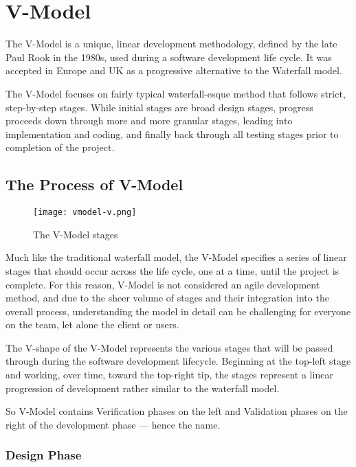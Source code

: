 \documentclass[main.tex]{subfiles}
\begin{document}
\section{V-Model}

The V-Model is a unique, linear development methodology, defined by the late Paul Rook in the 1980s, used during a software development life cycle.
It was accepted in Europe and UK as a progressive alternative to the Waterfall model.

The V-Model focuses on fairly typical waterfall-esque method that follows strict, step-by-step stages. While initial stages are broad design stages, progress proceeds down through more and more granular stages, leading into implementation and coding, and finally back through all testing stages prior to completion of the project.

\subsection{The Process of V-Model}

\begin{wrapfigure}[13]{l}[2em]{0.6\textwidth}
	\vspace*{-\baselineskip}
	\texttt{[image: vmodel-v.png]}
	\caption{The V-Model stages\label{fig:vmodel-v}}
\end{wrapfigure}

Much like the traditional waterfall model, the V-Model specifies a series of linear stages that should occur across the life cycle, one at a time, until the project is complete.
For this reason, V-Model is not considered an agile development method, and due to the sheer volume of stages and their integration into the overall process, understanding the model in detail can be challenging for everyone on the team, let alone the client or users.

The V-shape of the V-Model represents the various stages that will be passed through during the software development lifecycle.
Beginning at the top-left stage and working, over time, toward the top-right tip, the stages represent a linear progression of development rather similar to the waterfall model.

So V-Model contains Verification phases on the left and Validation phases on the right of the development phase --- hence the name.

\subsubsection{Design Phase}
\end{document}
